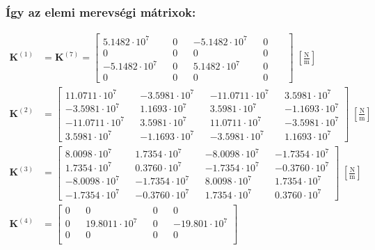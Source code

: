 \documentclass[12pt,a4paper]{article}
\def\mx#1{\mathbf{#1}}
\def\Nm{\; \left[\mathrm{\frac{N}{m}}\right]}
\def\futyi{\cdot 10^{7}}
\begin{document}
\subsubsection*{Így az elemi merevségi mátrixok:}
\begin{align}
    \mx{K}^{\left(1\right)} & =\mx{K}^{\left(7\right)}=
    \begin{bmatrix}
        5.1482 \futyi  &  & 0 &  & -5.1482 \futyi &  & 0      \\
        0              &  & 0 &  & 0              &  & 0 &  & \\
        -5.1482 \futyi &  & 0 &  & 5.1482 \futyi  &  & 0      \\
        0              &  & 0 &  & 0              &  & 0 &  &
    \end{bmatrix} \Nm                        \\
    \mx{K}^{\left(2\right)} & =
    \begin{bmatrix}
        11.0711 \futyi  &  & -3.5981 \futyi &  & -11.0711 \futyi &  & 3.5981 \futyi  \\
        -3.5981 \futyi  &  & 1.1693 \futyi  &  & 3.5981 \futyi   &  & -1.1693 \futyi \\
        -11.0711 \futyi &  & 3.5981 \futyi  &  & 11.0711 \futyi  &  & -3.5981 \futyi \\
        3.5981 \futyi   &  & -1.1693 \futyi &  & -3.5981 \futyi  &  & 1.1693 \futyi
    \end{bmatrix} \Nm \\
    \mx{K}^{\left(3\right)} & =
    \begin{bmatrix}
        8.0098 \futyi  &  & 1.7354 \futyi  &  & -8.0098 \futyi &  & -1.7354 \futyi \\
        1.7354 \futyi  &  & 0.3760 \futyi  &  & -1.7354 \futyi &  & -0.3760 \futyi \\
        -8.0098 \futyi &  & -1.7354 \futyi &  & 8.0098 \futyi  &  & 1.7354 \futyi  \\
        -1.7354 \futyi &  & -0.3760 \futyi &  & 1.7354 \futyi  &  & 0.3760 \futyi
    \end{bmatrix} \Nm   \\
    \mx{K}^{\left(4\right)} & =
    \begin{bmatrix}
        0 &  & 0               &  & 0 &  & 0              \\
        0 &  & 19.8011 \futyi  &  & 0 &  & -19.801 \futyi \\
        0 &  & 0               &  & 0 &  & 0              \\

\end{bmatrix}
\end{align}
\end{document}
